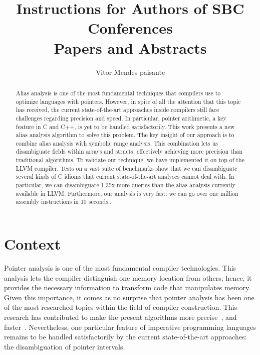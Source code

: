 \documentclass[12pt]{article}
\title{Instructions for Authors of SBC Conferences\\ Papers and Abstracts}
\author{Vitor Mendes paisante}
\begin{document}
 

\maketitle

\begin{abstract}
Alias analysis is one of the most fundamental techniques that
compilers use to optimize languages with pointers.
However, in spite of all the attention that this topic has received, the current
state-of-the-art approaches inside compilers still face challenges regarding
precision and speed.
In particular, pointer arithmetic, a key feature in C and C++, is yet to be
handled satisfactorily.
This work presents a new alias analysis algorithm to solve this problem.
The key insight of our approach is to combine alias analysis with symbolic
range analysis.
This combination lets us disambiguate fields within arrays and structs,
effectively achieving more precision than traditional algorithms.
To validate our technique, we have implemented it on top of the LLVM compiler.
Tests on a vast suite of benchmarks show that we can disambiguate several
kinds of C idioms that current state-of-the-art analyses cannot deal with.
In particular, we can disambiguate 1.35x more queries than the alias analysis
currently available in LLVM.
Furthermore, our analysis is very fast: we can go over one million assembly
instructions in 10 seconds..
\end{abstract}
     

\section {Context}
Pointer analysis is one of the most fundamental compiler technologies.
This analysis lets the compiler distinguish one memory location from others;
hence, it provides the necessary information to transform code that manipulates
memory.
Given this importance, it comes as no surprise that pointer analysis has been
one of the most researched topics within the field of compiler
construction\cite{Hind01}.
This research has contributed to make the present algorithms more
precise~\cite{Hardekopf07a,Zhang14}, and faster~\cite{Hardekopf11,Shang12}.
Nevertheless, one particular feature of imperative programming languages remains
to be handled satisfactorily by the current state-of-the-art approaches:
the disambiguation of pointer intervals.
\end{document}
